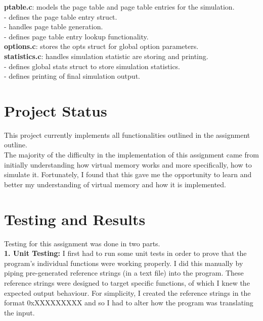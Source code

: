 \documentclass{article}
\begin{document}
\noindent
\textbf{ptable.c}: models the page table and page table entries for the simulation. \\
- defines the page table entry struct. \\
- handles page table generation. \\
- defines page table entry lookup functionality. \\

\noindent
\textbf{options.c}: stores the opts struct for global option parameters. \\

\noindent
\textbf{statistics.c}: handles simulation statistic are storing and printing. \\
- defines global stats struct to store simulation statistics. \\
- defines printing of final simulation output. \\

\section{Project Status}
This project currently implements all functionalities outlined in the
assignment outline. \\

\noindent
The majority of the difficulty in the implementation of this
assignment came from initially understanding how virtual memory works and
more specifically, how to simulate it.
Fortunately, I found that this gave me the opportunity to learn and
better my understanding of virtual memory and how it is implemented. \\

\section{Testing and Results}

\noindent
Testing for this assignment was done in two parts. \\

\noindent
\textbf{1. Unit Testing:}
I first had to run some unit tests in order to prove that the program's individual
functions were working properly. I did this manually by piping pre-generated
reference strings (in a text file) into the program. These reference strings
were designed to target specific functions, of which I knew the expected output
behaviour. For simplicity, I created the reference strings in the format 0xXXXXXXXXX
and so I had to alter how the program was translating the input. \\
\end{document}
